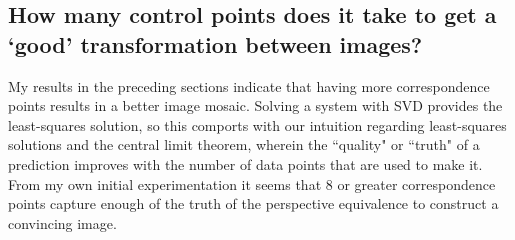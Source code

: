 \documentclass[]{article}
\begin{document}
	\subsection{How many control points does it take to get a `good' transformation between images?}
	My results in the preceding sections indicate that having more correspondence points results in a better image mosaic. Solving a system with SVD provides the least-squares solution, so this comports with our intuition regarding least-squares solutions and the central limit theorem, wherein the ``quality" or ``truth" of a prediction improves with the number of data points that are used to make it. From my own initial experimentation it seems that 8 or greater correspondence points capture enough of the truth of the perspective equivalence to construct a convincing image.
	
\end{document}
